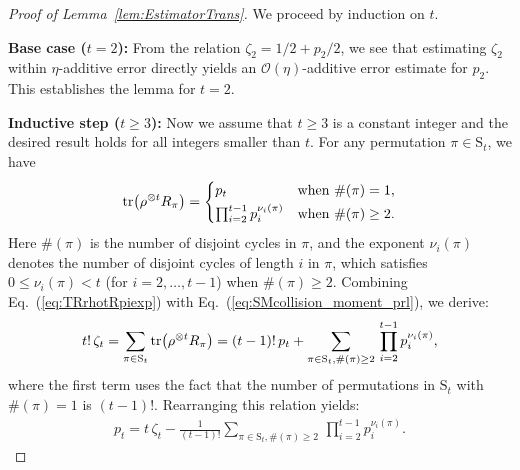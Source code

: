 \documentclass[aps,prl,twocolumn,nofootinbib,superscriptaddress,10pt]{revtex4-2}
\let\originalleft\left
\let\originalright\right
\renewcommand{\left}{\mathopen{}\mathclose\bgroup\originalleft}
\renewcommand{\right}{\aftergroup\egroup\originalright}
\DeclareMathOperator{\Tr}{tr}
\theoremstyle{plain}
\theoremstyle{definition}
\newcommand{\eref}[1]{Eq.~\textup{(\ref{#1})}}
\newcommand{\lref}[1]{Lemma~\ref{#1}}
\begin{document}
\begin{proof}[Proof of \lref{lem:EstimatorTrans}]
We proceed by induction on $t$. 

\textbf{Base case ($t=2$):} 
From the relation $\zeta_2= 1/2+p_2/2$, we see that estimating $\zeta_2$ within $\eta$-additive error directly yields an $\mathcal{O}(\eta)$-additive error estimate for $p_2$. This establishes the lemma for $t=2$.

\textbf{Inductive step ($t \geq 3$):} 
Now we assume that $t\geq3$ is a constant integer and the desired result holds for all integers smaller than $t$. 
For any permutation $\pi \in \mathrm{S}_t$, we have 
\begin{align}\label{eq:TRrhotRpiexp}
\Tr\left(\rho^{\otimes t}R_\pi\right)
=
\begin{cases}
	p_t &  \text{when } \#(\pi)=1, \\
	\vspace{-1.2em} \\
	\prod_{i=2}^{t-1} p_i^{\nu_i(\pi)}   &  \text{when } \#(\pi)\geq 2.
\end{cases}
\end{align}
Here $\#(\pi)$ is the number of disjoint cycles in $\pi$, and the exponent $\nu_i(\pi)$ denotes the number of disjoint cycles of length $i$ in $\pi$, which satisfies $0\leq \nu_i(\pi)<t$ (for $i=2,\dots,t-1$) when $\#(\pi)\geq2$. 
Combining \eref{eq:TRrhotRpiexp} with \eref{eq:SMcollision_moment_prl}, we derive:
\begin{align}
t!\,\zeta_t
=\sum_{\pi\in \mathrm{S}_t}\Tr\left(\rho^{\otimes t}R_\pi\right)
=
(t-1)!\, p_t 
+ \sum_{\pi\in \mathrm{S}_t, \#(\pi)\geq 2} \,\prod_{i=2}^{t-1} p_i^{\nu_i(\pi)}, 
\end{align}
where the first term uses the fact that the number of permutations in $\mathrm{S}_t$ with $\#(\pi)=1$ is $(t-1)!$.
Rearranging this relation yields:
\begin{align}\label{eq:ptExp1}
p_t = t\,\zeta_t - \frac{1}{(t-1)!} \sum_{\pi\in \mathrm{S}_t, \#(\pi)\geq 2} \,\prod_{i=2}^{t-1} p_i^{\nu_i(\pi)}.   
\end{align}


\end{proof}
\end{document}
